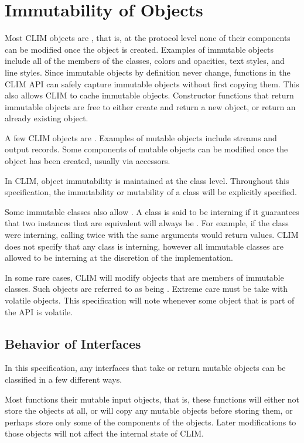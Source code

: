 \section {Immutability of Objects}

Most CLIM objects are , that is, at the protocol level none
of their components can be modified once the object is created.  Examples of
immutable objects include all of the members of the  classes, colors
and opacities, text styles, and line styles.  Since immutable objects by
definition never change, functions in the CLIM API can safely capture immutable
objects without first copying them.  This also allows CLIM to cache immutable
objects.  Constructor functions that return immutable objects are free to either
create and return a new object, or return an already existing object.

A few CLIM objects are .  Examples of mutable objects include
streams and output records.  Some components of mutable objects can be modified
once the object has been created, usually via  accessors.

In CLIM, object immutability is maintained at the class level.  Throughout this
specification, the immutability or mutability of a class will be explicitly
specified.

Some immutable classes also allow .  A class is said to be
interning if it guarantees that two instances that are equivalent will always be
.  For example, if the class  were interning, calling
 twice with the same arguments would return  values.
CLIM does not specify that any class is interning, however all immutable classes
are allowed to be interning at the discretion of the implementation.

In some rare cases, CLIM will modify objects that are members of immutable
classes.  Such objects are referred to as being .  Extreme
care must be take with volatile objects.  This specification will note whenever
some object that is part of the API is volatile.


\subsection {Behavior of Interfaces}

In this specification, any interfaces that take or return mutable objects can
be classified in a few different ways.

Most functions  their mutable input objects, that is,
these functions will either not store the objects at all, or will copy any
mutable objects before storing them, or perhaps store only some of the
components of the objects.  Later modifications to those objects will not
affect the internal state of CLIM.

